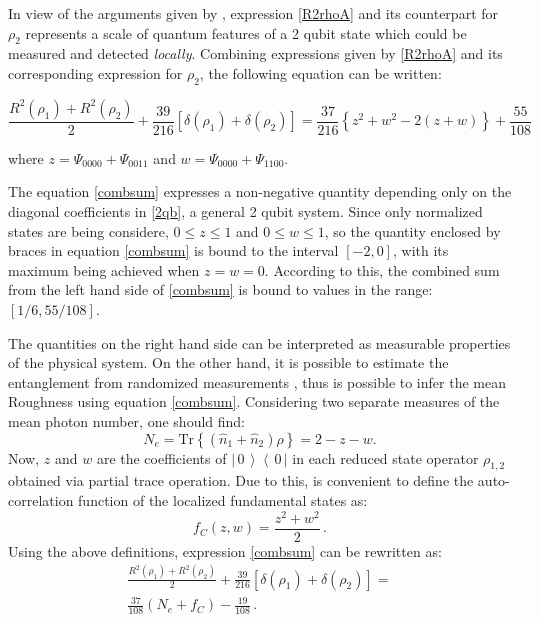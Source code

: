 \documentclass[aps,prl,preprint]{revtex4-1}
\newcommand{\bra}[1]{\ensuremath{\left\langle\, #1\,\right|}}
\newcommand{\ket}[1]{\ensuremath{\left|\,#1\,\right\rangle}}
\newcommand{\Tr}[1]{ \mbox{Tr}\left\{ #1 \right\} }
\begin{document}
	In view of the arguments given
	by  \cite{Lemos2018}, expression \eqref{R2rhoA} and its  counterpart for 
	$\rho_2$ represents a scale of quantum features of a 2 qubit  state which
	could be measured and detected \emph{locally}.  
	Combining expressions given by \eqref{R2rhoA} and its corresponding
	expression for $\rho_{2}$, the following equation can be written:
	\begin{widetext}
		\begin{equation}
		\frac{R^2(\rho_1) + R^2(\rho_2)}{2}+
		\frac{39}{216}\left[\delta(\rho_1)+\delta(\rho_2)\right]= \frac{37}{216}\left\{z^2+w^2-2(z+w)\right\}+\frac{55}{108}
		\label{combsum}
		\end{equation}%
	\end{widetext}
	where $z = \Psi_{0000}+\Psi_{0011}$ and $w = \Psi_{0000}+\Psi_{1100}$. 
	
	The equation \eqref{combsum} expresses a non-negative quantity depending only on the
	diagonal coefficients in \eqref{2qb}, a general 2 qubit
	system. Since only normalized states are being considere, $0\leq z \leq 1$ and
	$0\leq w \leq 1$, so the quantity enclosed by braces in 
	equation %
	\eqref{combsum} is bound to the interval $[-2,0]$, with its maximum being
	achieved when $z=w=0$.
	According to this, the 
	combined sum from the left hand side of \eqref{combsum} is bound to values in the range: 
	$[1/6,55/108]$. 
	
	The quantities on the right hand side can be interpreted 
	as measurable properties of the physical system. On the other hand, it is possible to estimate the entanglement from randomized measurements \cite{Imai}, thus is possible to infer the mean Roughness using equation \ref{combsum}.
	Considering two separate measures of the mean photon number, 
	one should  find:
	\begin{equation}
	N_e = \Tr{(\hat{n}_1+\hat{n}_2)\rho} = 2-z-w.
	\end{equation}
	Now, $z$ and $w$ are the coefficients of $\ket{0}\bra{0}$
	in each reduced state operator $\rho_{1,2}$ obtained via partial trace
	operation. Due to this, is convenient to define the auto-correlation function
	of the localized fundamental states as:
	\begin{equation}
	f_C(z, w) = \frac{z^2+w^2}{2}\,.
	\label{fC_def}
	\end{equation}
	Using the above definitions, expression \eqref{combsum} can be
	rewritten as:
	\begin{equation}
	\begin{split}
	 \frac{R^2(\rho_1) + R^2(\rho_2)}{2}+
	\frac{39}{216}\left[\delta(\rho_1)+\delta(\rho_2)\right]=\\
	\frac{37}{108}(N_e + f_C) - \frac{19}{108}\,.
	\label{R2DNefC}
	\end{split}
	\end{equation}
	
\end{document}
